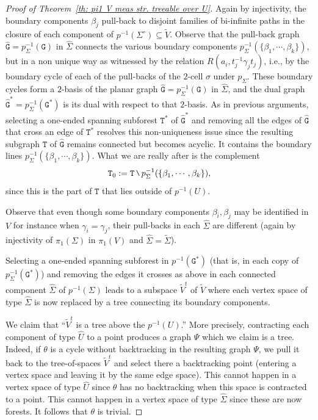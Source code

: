 \documentclass[11pt]{amsart}
\theoremstyle{definition}
\theoremstyle{plain}
\newcommand{\<}{\langle}
\renewcommand{\>}{\rangle}
\newcommand\GGG{\mathtt{G}}
\newcommand\TTT{\mathtt{T}}
\newcommand{\mysetminusD}{\hbox{\tikz{\draw[line width=0.6pt,line cap=round] (3pt,0) -- (0,6pt);}}}
\newcommand{\mysetminusT}{\mysetminusD}
\newcommand{\mysetminusS}{\hbox{\tikz{\draw[line width=0.45pt,line cap=round] (2pt,0) -- (0,4pt);}}}
\newcommand{\mysetminusSS}{\hbox{\tikz{\draw[line width=0.4pt,line cap=round] (1.5pt,0) -- (0,3pt);}}}
\newcommand{\mysetminus}{\mathbin{\mathchoice{\mysetminusD}{\mysetminusT}{\mysetminusS}{\mysetminusSS}}}%
\begin{document}
\begin{proof}[Proof of Theorem~\ref{th: pi1 V meas str. treeable over U}]
Again by injectivity, the boundary components $\beta_j$ pull-back to disjoint families of bi-infinite paths in the closure of each component of $p^{-1}(\Sigma^{\circ})\subseteq \tilde{V}$.
Observe that the pull-back graph $\widehat{\GGG}=p_{\Sigma}^{-1}(\GGG)$ in $\widehat{\Sigma}$ connects the various boundary components $p_{\Sigma}^{-1}(\{\beta_1, \cdots, \beta_k\})$, but in a non unique way as witnessed by the relation $R(a_i,t_j^{-1}\gamma_j t_j)$, i.e.,
by the boundary cycle of each of the pull-backs of the $2$-cell $\sigma$ under $p_{\Sigma}$.
These boundary cycles form a $2$-basis of the planar graph
$\widehat{\GGG}=p_{\Sigma}^{-1}(\GGG)$ in $\widehat{\Sigma}$, and the dual graph $\widehat{\GGG}^*=p_{\Sigma}^{-1}(\GGG^*)$ is its dual with respect to that $2$-basis.
As in previous arguments, selecting a one-ended spanning subforest $\TTT^*$ of $\widehat{\GGG}^*$ and removing all the edges of $\widehat{\GGG}$ that cross an edge of $\TTT^*$ resolves this non-uniqueness issue since the resulting subgraph $\TTT$ of $\widehat{\GGG}$ remains connected but becomes acyclic. It contains the boundary lines $p_{\Sigma}^{-1}(\{\beta_1, \cdots, \beta_k\})$.
What we are really after is the complement $$\TTT_0:=\TTT\mysetminus p_{\Sigma}^{-1}(\{\beta_1, \cdots, \beta_k\}),$$
since this is the part of $\TTT$ that lies outside of $p^{-1}(U)$.

Observe that even though some boundary components $\beta_i, \beta_j$ may be identified in $V$ for instance when $\gamma_i=\gamma_j$, their pull-backs in each $\widehat{\Sigma}$ are different (again by injectivity of $\pi_1(\Sigma)$ in $\pi_1(V)$ and $\widehat{\Sigma}=\widetilde{\Sigma}$).




Selecting a one-ended spanning subforest in $p^{-1}(\GGG^*)$ (that is, in each copy of $p_{\Sigma}^{-1}(\GGG^*)$)
and removing the edges it crosses as above in each connected component $\widehat{\Sigma}$ of $p^{-1}(\Sigma)$
leads to a subspace $\widetilde{V}^t$ of $\widetilde{V}$ where each vertex space of type $\widehat{\Sigma}$ is now replaced by a tree connecting its boundary components.


We claim that ``$\widetilde{V}^t$ is a tree above the $p^{-1}({U})$.''
More precisely, contracting each component of type $\widehat{U}$
to a point
produces a graph $\Psi$  which we claim is a tree.   Indeed, if $\theta$ is a cycle without backtracking in the resulting graph $\Psi$, we pull it back to the tree-of-spaces $\widetilde{V}^t$ and select there a backtracking point (entering a vertex space and leaving it by the same edge space). This cannot happen in a vertex space of type $\widehat{U}$ since  $\theta$ has no backtracking when this space is contracted to a point. This cannot happen  in a vertex space of type $\widehat{\Sigma}$ since these are now forests. It follows that $\theta$ is trivial.





\end{proof}
\end{document}
